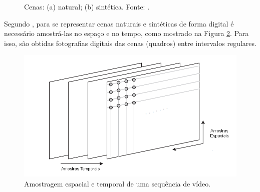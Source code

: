 \begin{figure}[h]
    \centering
    \qquad
    \caption{Cenas: (a) natural; (b) sintética. Fonte: \cite{imagensTeste}.}%
	    
    \label{fig:RGB}%
\end{figure}

Segundo \cite{garcia2013tecnicas}, para se representar cenas naturais e sintéticas de forma digital é necessário amostrá-las no espaço e no tempo, como mostrado na Figura \ref{AMOSTRAGEM_VIDEO}. Para isso, são obtidas fotografias digitais das cenas (quadros) entre intervalos regulares.

\begin{figure}[h]
	\centering
	\includegraphics[scale=0.65]{figuras/AMOSTRAGEM_VIDEO.png}
	\caption{Amostragem espacial e temporal de uma sequência de vídeo.}
	\label{AMOSTRAGEM_VIDEO}
\end{figure}

